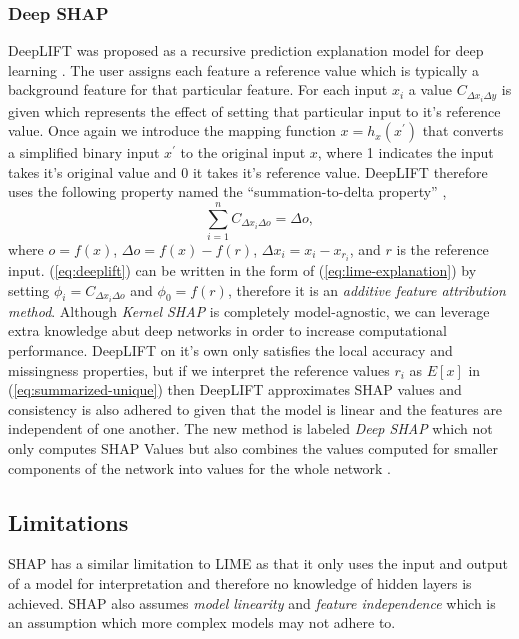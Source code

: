 \subsubsection{Deep SHAP}
DeepLIFT was proposed as a recursive prediction explanation model for deep learning \cite{DBLP:journals/corr/ShrikumarGSK16}\cite{DBLP:journals/corr/ShrikumarGK17}. The user assigns each feature a reference value which is typically a background feature for that particular feature. For each input $x_{i}$ a value $C_{\Delta{x_{i}}\Delta{y}}$ is given which represents the effect of setting that particular input to it's reference value. Once again we introduce the mapping function $x = h_{x}(x^{'})$ that converts a simplified binary input $x^{'}$ to the original input $x$, where 1 indicates the input takes it's original value and 0 it takes it's reference value.
DeepLIFT therefore uses the following property named the ``summation-to-delta property'' \cite{NIPS2017_7062},
\begin{equation}
    \sum\limits_{i=1}^{n}C_{\Delta{x_{i}}\Delta{o}} = \Delta{o},
    \label{eq:deeplift}
\end{equation}
    where $o = f(x)$, $\Delta{o} = f(x) - f(r)$, $\Delta{x_{i}} = x_{i} - x_{r_{i}}$, and $r$ is the reference input.
    (\ref{eq:deeplift}) can be written in the form of (\ref{eq:lime-explanation}) by setting $\phi_{i} = C_{\Delta{x_{i}}\Delta{o}}$ and $\phi_{0} = f(r)$, therefore it is an \emph{additive feature attribution method}.
Although \emph{Kernel SHAP} is completely model-agnostic, we can leverage extra knowledge abut deep networks in order to increase computational performance. DeepLIFT on it's own only satisfies the local accuracy and missingness properties, but if we interpret the reference values $r_{i}$ as $E[x]$ in  (\ref{eq:summarized-unique}) then DeepLIFT approximates SHAP values and consistency is also adhered to given that the model is linear and the features are independent of one another. The new method is labeled \emph{Deep SHAP} which not only computes SHAP Values but also combines the values computed for smaller components of the network into values for the whole network \cite{NIPS2017_7062}.


\subsection{Limitations}
SHAP has a similar limitation to LIME as that it only uses the input and output of a model for interpretation and therefore no knowledge of hidden layers is achieved. SHAP also assumes \emph{model linearity} and \emph{feature independence} which is an assumption which more complex models may not adhere to.




